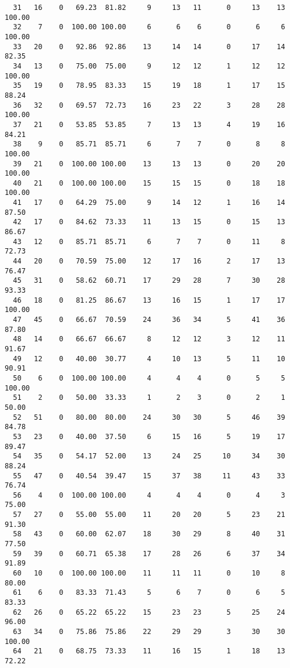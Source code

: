 \begin{verbatim}
  31   16    0   69.23  81.82     9     13   11      0     13    13   100.00
  32    7    0  100.00 100.00     6      6    6      0      6     6   100.00
  33   20    0   92.86  92.86    13     14   14      0     17    14    82.35
  34   13    0   75.00  75.00     9     12   12      1     12    12   100.00
  35   19    0   78.95  83.33    15     19   18      1     17    15    88.24
  36   32    0   69.57  72.73    16     23   22      3     28    28   100.00
  37   21    0   53.85  53.85     7     13   13      4     19    16    84.21
  38    9    0   85.71  85.71     6      7    7      0      8     8   100.00
  39   21    0  100.00 100.00    13     13   13      0     20    20   100.00
  40   21    0  100.00 100.00    15     15   15      0     18    18   100.00
  41   17    0   64.29  75.00     9     14   12      1     16    14    87.50
  42   17    0   84.62  73.33    11     13   15      0     15    13    86.67
  43   12    0   85.71  85.71     6      7    7      0     11     8    72.73
  44   20    0   70.59  75.00    12     17   16      2     17    13    76.47
  45   31    0   58.62  60.71    17     29   28      7     30    28    93.33
  46   18    0   81.25  86.67    13     16   15      1     17    17   100.00
  47   45    0   66.67  70.59    24     36   34      5     41    36    87.80
  48   14    0   66.67  66.67     8     12   12      3     12    11    91.67
  49   12    0   40.00  30.77     4     10   13      5     11    10    90.91
  50    6    0  100.00 100.00     4      4    4      0      5     5   100.00
  51    2    0   50.00  33.33     1      2    3      0      2     1    50.00
  52   51    0   80.00  80.00    24     30   30      5     46    39    84.78
  53   23    0   40.00  37.50     6     15   16      5     19    17    89.47
  54   35    0   54.17  52.00    13     24   25     10     34    30    88.24
  55   47    0   40.54  39.47    15     37   38     11     43    33    76.74
  56    4    0  100.00 100.00     4      4    4      0      4     3    75.00
  57   27    0   55.00  55.00    11     20   20      5     23    21    91.30
  58   43    0   60.00  62.07    18     30   29      8     40    31    77.50
  59   39    0   60.71  65.38    17     28   26      6     37    34    91.89
  60   10    0  100.00 100.00    11     11   11      0     10     8    80.00
  61    6    0   83.33  71.43     5      6    7      0      6     5    83.33
  62   26    0   65.22  65.22    15     23   23      5     25    24    96.00
  63   34    0   75.86  75.86    22     29   29      3     30    30   100.00
  64   21    0   68.75  73.33    11     16   15      1     18    13    72.22

\end{verbatim}
